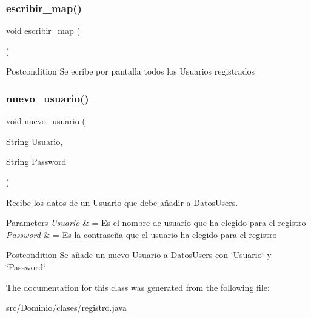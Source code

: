 \subsubsection{escribir\+\_\+map()}
{\footnotesize\ttfamily void escribir\+\_\+map (\begin{DoxyParamCaption}{ }\end{DoxyParamCaption})\hspace{0.3cm}{\ttfamily [inline]}}

\begin{DoxyPostcond}{Postcondition}
Se ecribe por pantalla todos los Usuarios registrados 
\end{DoxyPostcond}
\mbox{\label{class_dominio_1_1clases_1_1registro_ac783afd6cdbd7ecadd753d6663fd2144}} 
\subsubsection{nuevo\+\_\+usuario()}
{\footnotesize\ttfamily void nuevo\+\_\+usuario (\begin{DoxyParamCaption}\item[{String}]{Usuario,  }\item[{String}]{Password }\end{DoxyParamCaption})\hspace{0.3cm}{\ttfamily [inline]}}



Recibe los datos de un Usuario que debe añadir a Datos\+Users. 


\begin{DoxyParams}{Parameters}
{\em Usuario} & = Es el nombre de usuario que ha elegido para el registro \\
\hline
{\em Password} & = Es la contraseña que el usuario ha elegido para el registro\\
\hline
\end{DoxyParams}
\begin{DoxyPostcond}{Postcondition}
Se añade un nuevo Usuario a Datos\+Users con \char`\"{}\+Usuario\char`\"{} y \char`\"{}\+Password\char`\"{} 
\end{DoxyPostcond}


The documentation for this class was generated from the following file\+:\begin{DoxyCompactItemize}
\item 
src/\+Dominio/clases/registro.\+java\end{DoxyCompactItemize}
